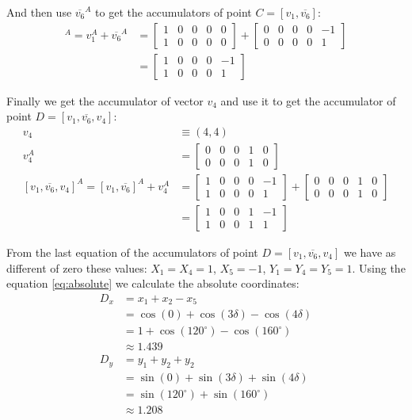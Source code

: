 \documentclass[11pt]{article}
\begin{document}
And then use $\overline{v_6}^A$ to get the accumulators of point $C=[v_1,\overline{v_6}]$:
\begin{align}
[v_1, \overline{v_6}]^A = v_1^A + \overline{v_6}^A
 &= \left[\begin{array}{ccccc}1&0&0&0&0 \\ 1&0&0&0&0 \end{array}\right] +
 \left[\begin{array}{ccccc}0&0&0&0&-1 \\ 0&0&0&0&1 \end{array}\right]\nonumber\\
 &= \left[\begin{array}{ccccc}1&0&0&0&-1 \\ 1&0&0&0&1 \end{array}\right]
\end{align}

Finally we get the accumulator of vector $v_4$ and use it to get the accumulator of point $D = [v_1,\overline{v_6},v_4]$:
\begin{align}
v_4 &\equiv (4,4)\nonumber\\
v_4^A &= \left[\begin{array}{ccccc}0&0&0&1&0 \\ 0&0&0&1&0 \end{array}\right]\nonumber\\
[v_1, \overline{v_6}, v_4]^A = [v_1, \overline{v_6}]^A + v_4^A
 &= \left[\begin{array}{ccccc}1&0&0&0&-1 \\ 1&0&0&0&1 \end{array}\right]
 + \left[\begin{array}{ccccc}0&0&0&1&0 \\ 0&0&0&1&0 \end{array}\right]\nonumber\\
 &= \left[\begin{array}{ccccc}1&0&0&1&-1 \\ 1&0&0&1&1 \end{array}\right]
\end{align}

From the last equation of the accumulators of point $D = [v_1,\overline{v_6},v_4]$ we have as different of zero these values: $X_1=X_4=1$, $X_5=-1$, $Y_1=Y_4=Y_5=1$. Using the equation \ref{eq:absolute} we calculate the absolute coordinates:
\begin{align*}
D_x &= x_1 + x_2 - x_5\\
    &= \cos(0) + \cos(3\delta) - \cos(4\delta)\\
    &= 1 + \cos(120^\circ) - \cos(160^\circ)\\
    &\approx 1.439\\
D_y &= y_1 + y_2 + y_2\nonumber\\
    &= \sin(0) + \sin(3\delta) + \sin(4\delta)\\
    &= \sin(120^\circ) + \sin(160^\circ)\\
    &\approx 1.208
\end{align*}
\end{document}
